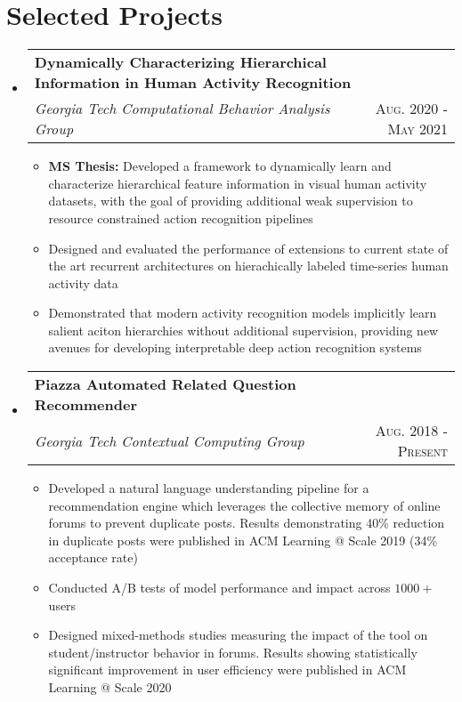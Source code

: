 \documentclass[letterpaper,11pt]{article}
\makeatletter
\newcommand{\resumePlainItem}[1]{
  \item\small{#1 \vspace{-1.0pt}}
}
\newcommand{\resumeSubheading}[4]{
  \vspace{-1pt}\item[]
    \begin{tabular*}{0.97\textwidth}{l@{\extracolsep{\fill}}r}
      \textbf{#1} & #2 \\
      \textit{\small#3} & \textsc{\small #4} \\ %
    \end{tabular*}\vspace{-5pt}
}
\newcommand{\resumeSubHeadingListStart}{\begin{itemize}[leftmargin=*]}
\newcommand{\resumeSubHeadingListEnd}{\end{itemize}}
\newcommand{\resumeItemListStart}{\begin{itemize}}
\newcommand{\resumeItemListEnd}{\end{itemize}\vspace{-5pt}}
\newenvironment{resumeItemList}{\resumeItemListStart}{\resumeItemListEnd}
\newenvironment{resumeSubheadingList}{\resumeSubHeadingListStart}{\resumeSubHeadingListEnd}
\makeatother
\begin{document}
\section{Selected Projects}
  \begin{resumeSubheadingList}
    \resumeSubheading{Dynamically Characterizing Hierarchical Information in Human Activity Recognition}{}
    {Georgia Tech Computational Behavior Analysis Group}{\hspace{-1.0in} Aug. 2020 - May 2021}
    \begin{resumeItemList}
      \resumePlainItem{\textbf{MS Thesis:} Developed a framework to dynamically learn and characterize
      hierarchical feature information in visual human activity datasets,
      with the goal of providing additional weak supervision to resource constrained
      action recognition pipelines}
      \resumePlainItem{Designed and evaluated the performance of extensions to current state of the art recurrent architectures
      on hierachically labeled time-series human activity data}
      \resumePlainItem{Demonstrated that modern activity recognition models implicitly learn salient
      aciton hierarchies without additional supervision, providing new avenues for developing
      interpretable deep action recognition systems}
    \end{resumeItemList}
    \pagebreak
    \resumeSubheading
    {Piazza Automated Related Question Recommender}{} %
    {Georgia Tech Contextual Computing Group}{Aug. 2018 - Present}
    \begin{resumeItemList}
      \resumePlainItem{Developed a natural language understanding pipeline
      for a recommendation engine which leverages the collective memory of
      online forums to prevent duplicate posts. Results demonstrating 40\% reduction in
      duplicate posts were published in ACM Learning @ Scale 2019 (34\% acceptance rate)}
      \resumePlainItem{Conducted A/B tests of model performance and impact across $1000+$ users}
      \resumePlainItem{Designed mixed-methods studies measuring the impact of
      the tool on student/instructor behavior in forums. Results showing statistically significant
      improvement in user efficiency were published in ACM Learning @ Scale 2020}

\end{resumeItemList}
\end{resumeSubheadingList}
\end{document}
